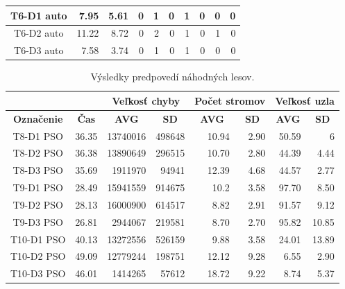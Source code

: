 \documentclass[a4paper,slovak,12pt,appendix]{article}
\begin{document}
\begin{appendices}
\begin{table}[!ht]
\begin{tabular}{|c|r|r|r|r|r|r|r|r|r|}
		T6-D1 auto	&		7.95		&	5.61		&	0	&	1	&	0	&	1	&	0	&	0			&	0	\\ \hline
		T6-D2 auto	&		11.22		&	8.72		&	0	&	2	&	0	&	1	&	0	&	1			&	0	\\ \hline
		T6-D3 auto	&		7.58		&	3.74		&	0	&	1	&	0	&	1	&	0	&	0			&	0	\\ \hline

  \end{tabular}
\end{table}
\newpage

\begin{table}[!ht]
  \centering
  \caption{Výsledky predpovedí náhodných lesov.}
  \label{tab-test-rf-result}
  \begin{tabular}{|c|r|r|r|r|r|r|r|}
    \hline
		\multicolumn{2}{|c|}{}									&			\multicolumn{2}{|c|}{\textbf{Veľkosť chyby}}		&					\multicolumn{2}{|c|}{\textbf{Počet stromov}}				&			\multicolumn{2}{|c|}{\textbf{Veľkosť uzla}} \\ \hline
		\multicolumn{1}{|c|}{\textbf{Označenie}}  &		\multicolumn{1}{|c|}{\textbf{Čas}}  	&						\multicolumn{1}{|c|}{\textbf{AVG}}  &   \multicolumn{1}{|c|}{\textbf{SD}}							&								\multicolumn{1}{|c|}{\textbf{AVG}}  &   \multicolumn{1}{|c|}{\textbf{SD}}									&						\multicolumn{1}{|c|}{\textbf{AVG}}  &   \multicolumn{1}{|c|}{\textbf{SD}} 	 			\\ \hline
		T8-D1 PSO			&	36.35	&	13740016		&	498648	&	10.94	&	2.90	&	50.59	&	6			\\ \hline
		T8-D2 PSO			&	36.38	&	13890649		&	296515	&	10.70	&	2.80	&	44.39	&	4.44	\\ \hline
		T8-D3 PSO			&	35.69	&	1911970			&	94941		&	12.39	&	4.68	&	44.57	&	2.77	\\ \hline

		T9-D1 PSO			&	28.49	&	15941559		&	914675	&	10.2	&	3.58	&	97.70	&	8.50	\\ \hline
		T9-D2 PSO			&	28.13	&	16000900		&	614517	&	8.82	&	2.91	&	91.57	&	9.12	\\ \hline
		T9-D3 PSO			&	26.81	&	2944067			&	219581	&	8.70	&	2.70	&	95.82	&	10.85	\\ \hline

		T10-D1 PSO		&	40.13	&	13272556		&	526159	&	9.88	&	3.58	&	24.01	&	13.89	\\ \hline
		T10-D2 PSO		&	49.09	&	12779244		&	198751	&	12.12	&	9.28	&	6.55	&	2.90	\\ \hline
		T10-D3 PSO		&	46.01	&	1414265			&	57612		&	18.72	&	9.22	&	8.74	&	5.37	\\ \hline


\end{tabular}
\end{table}
\end{appendices}
\end{document}
